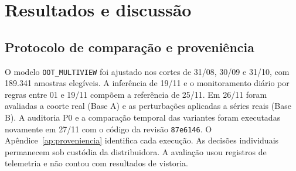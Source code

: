 \chapter{Resultados e discussão}\label{resultados-e-discussao}
\section{Protocolo de comparação e proveniência}
O modelo \texttt{OOT\_MULTIVIEW} foi ajustado nos cortes de 31/08, 30/09 e 31/10, com 189.341 amostras elegíveis. A inferência de 19/11 e o monitoramento diário por regras entre 01 e 19/11 compõem a referência de 25/11. Em 26/11 foram avaliadas a coorte real (Base A) e as perturbações aplicadas a séries reais (Base B). A auditoria P0 e a comparação temporal das variantes foram executadas novamente em 27/11 com o código da revisão \texttt{87e6146}. O Apêndice~\ref{ap:proveniencia} identifica cada execução. As decisões individuais permanecem sob custódia da distribuidora. A avaliação usou registros de telemetria e não contou com resultados de vistoria.

